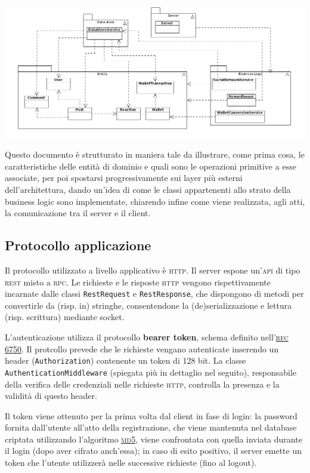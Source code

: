 \documentclass[a4paper,8pt]{article} %
\def\code#1{\texttt{#1}}
\begin{document}
\includegraphics[width=\textwidth]{dependencies.png}

\par Questo documento è strutturato in maniera tale da illustrare, come prima cosa, le caratteristiche delle entità
di dominio e quali sono le operazioni primitive a esse associate, per poi spostarsi progressivamente sui layer
più esterni dell'architettura, dando un'idea di come le classi appartenenti allo strato della business logic sono
implementate, chiarendo infine come viene realizzata, agli atti, la comunicazione tra il server e il client.\\
\subsection{Protocollo applicazione}
Il protocollo utilizzato a livello applicativo è \textsc{http}. Il server espone un'\textsc{api} di tipo \textsc{rest} misto a \textsc{rpc}. Le richieste e le risposte \textsc{http} vengono
rispettivamente incarnate dalle classi \code{RestRequest} e \code{RestResponse}, che dispongono di metodi per convertirle da (risp. in) stringhe, consentendone
la (de)serializzazione e lettura (risp. scrittura) mediante socket.
\par L'autenticazione utilizza il protocollo \textbf{bearer token}, schema definito nell'\href{https://datatracker.ietf.org/doc/html/rfc6750}{\textsc{rfc} 6750}.
Il protcollo prevede che le richieste vengano autenticate inserendo un header (\code{Authorization}) contenente un token di 128 bit.
La classe \code{AuthenticationMiddleware} (spiegata più in dettaglio nel seguito), responsabile della verifica delle credenziali nelle richieste \textsc{http},
controlla la presenza e la validità di questo header.
\par Il token viene ottenuto per la prima volta dal client in fase di login: la password fornita dall'utente all'atto della registrazione, che viene mantenuta
nel database criptata utilizzando l'algoritmo \href{https://en.wikipedia.org/wiki/MD5}{\textsc{md5}}, viene confrontata con quella inviata durante il login (dopo aver
cifrato anch'essa); in caso di esito positivo, il server emette un token che l'utente utilizzerà nelle successive richieste (fino al logout).
\end{document}
